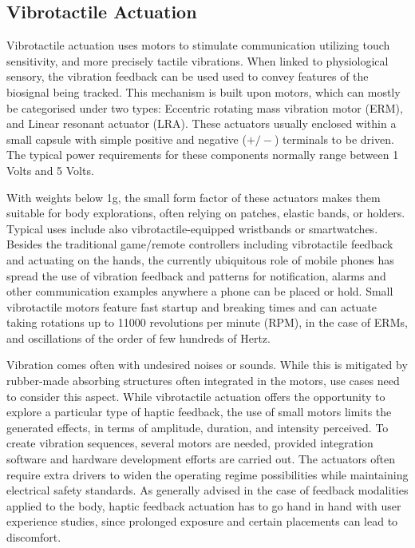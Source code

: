 \subsection*{Vibrotactile Actuation}

Vibrotactile actuation uses motors to stimulate communication utilizing touch sensitivity, and more precisely tactile vibrations. When linked to physiological sensory, the vibration feedback can be used used to convey features of the biosignal being tracked. This mechanism is built upon motors, which can mostly be categorised under two types: Eccentric rotating mass vibration motor (ERM), and Linear resonant actuator (LRA). These actuators usually enclosed within a small capsule with simple positive and negative ($+/-$) terminals to be driven. The typical power requirements for these components normally range between 1 Volts and 5 Volts.

With weights below 1g, the small form factor of these actuators makes them suitable for body explorations, often relying on patches, elastic bands, or holders. Typical uses include also vibrotactile-equipped wristbands or smartwatches. Besides the traditional game/remote controllers including vibrotactile feedback and actuating on the hands, the currently ubiquitous role of mobile phones has spread the use of vibration feedback and patterns for notification, alarms and other communication examples anywhere a phone can be placed or hold. Small vibrotactile motors feature fast startup and breaking times and can actuate taking rotations up to 11000 revolutions per minute (RPM), in the case of ERMs, and oscillations of the order of few hundreds of Hertz.

Vibration comes often with undesired noises or sounds. While this is mitigated by rubber-made absorbing structures often integrated in the motors, use cases need to consider this aspect. While vibrotactile actuation offers the opportunity to explore a particular type of haptic feedback, the use of small motors limits the generated effects, in terms of amplitude, duration, and intensity perceived. To create vibration sequences, several motors are needed, provided integration software and hardware development efforts are carried out. The actuators often require extra drivers to widen the operating regime possibilities while maintaining electrical safety standards. As generally advised in the case of feedback modalities applied to the body, haptic feedback actuation has to go hand in hand with user experience studies, since prolonged exposure and certain placements can lead to discomfort.

